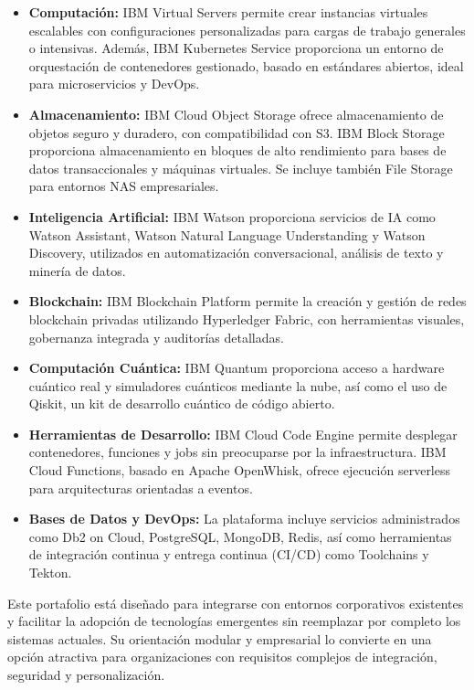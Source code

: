 {                \begin{itemize}
                    \item \textbf{Computación:} IBM Virtual Servers permite crear instancias virtuales escalables con configuraciones personalizadas para cargas de trabajo generales o intensivas. Además, IBM Kubernetes Service proporciona un entorno de orquestación de contenedores gestionado, basado en estándares abiertos, ideal para microservicios y DevOps.
                    \item \textbf{Almacenamiento:} IBM Cloud Object Storage ofrece almacenamiento de objetos seguro y duradero, con compatibilidad con S3. IBM Block Storage proporciona almacenamiento en bloques de alto rendimiento para bases de datos transaccionales y máquinas virtuales. Se incluye también File Storage para entornos NAS empresariales.
                    \item \textbf{Inteligencia Artificial:} IBM Watson proporciona servicios de IA como Watson Assistant, Watson Natural Language Understanding y Watson Discovery, utilizados en automatización conversacional, análisis de texto y minería de datos.
                    \item \textbf{Blockchain:} IBM Blockchain Platform permite la creación y gestión de redes blockchain privadas utilizando Hyperledger Fabric, con herramientas visuales, gobernanza integrada y auditorías detalladas.
                    \item \textbf{Computación Cuántica:} IBM Quantum proporciona acceso a hardware cuántico real y simuladores cuánticos mediante la nube, así como el uso de Qiskit, un kit de desarrollo cuántico de código abierto.
                    \item \textbf{Herramientas de Desarrollo:} IBM Cloud Code Engine permite desplegar contenedores, funciones y jobs sin preocuparse por la infraestructura. IBM Cloud Functions, basado en Apache OpenWhisk, ofrece ejecución serverless para arquitecturas orientadas a eventos.
                    \item \textbf{Bases de Datos y DevOps:} La plataforma incluye servicios administrados como Db2 on Cloud, PostgreSQL, MongoDB, Redis, así como herramientas de integración continua y entrega continua (CI/CD) como Toolchains y Tekton.
                \end{itemize}
                
                Este portafolio está diseñado para integrarse con entornos corporativos existentes y facilitar la adopción de tecnologías emergentes sin reemplazar por completo los sistemas actuales. Su orientación modular y empresarial lo convierte en una opción atractiva para organizaciones con requisitos complejos de integración, seguridad y personalización.
                
}
